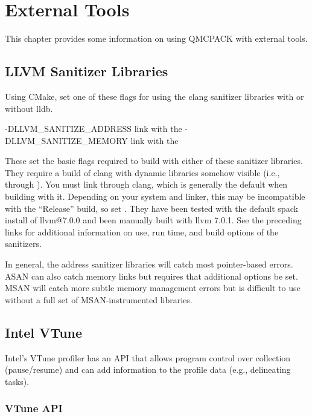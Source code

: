 \chapter{External Tools}
\label{chap:external_tools}
This chapter provides some information on using QMCPACK with external tools.

\section{LLVM Sanitizer Libraries}\label{tool:LLVM-Sanitizer-Libraries}

Using CMake, set one of these flags for using the clang sanitizer libraries with or without lldb.

\begin{shade}
-DLLVM_SANITIZE_ADDRESS    link with the %
-DLLVM_SANITIZE_MEMORY     link with the %
\end{shade}

These set the basic flags required to build with either of these sanitizer libraries. They require a build of clang with dynamic libraries somehow visible (i.e., through ). You must link through clang, which is generally the default when building with it. Depending on your system and linker, this may be incompatible with the ``Release'' build, so set . They have been tested with the default spack install of llvm@7.0.0 and been manually built with llvm 7.0.1. See the preceding  links for additional information on use, run time, and build options of the sanitizers.

In general, the address sanitizer libraries will catch most pointer-based errors. ASAN can also catch memory links but requires that additional options be set. MSAN will catch more subtle memory management errors but is difficult to use without a full set of MSAN-instrumented libraries.

\section{Intel VTune}

Intel's VTune profiler has an API that allows program control over collection (pause/resume) and can add information to the profile data (e.g., delineating tasks).

\subsection{VTune API}

